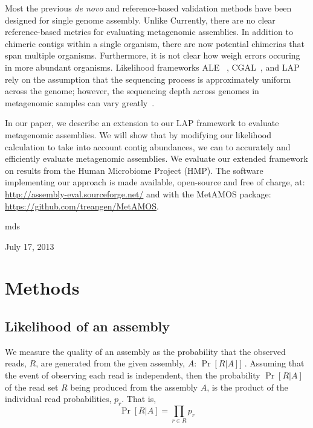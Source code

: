 \documentclass[conference]{IEEEtran}
\begin{document}
Most the previous \emph{de novo} and reference-based validation methods have been designed for single genome assembly.
Unlike 
Currently, there are no clear reference-based metrics for evaluating metagenomic assemblies.
In addition to chimeric contigs within a single organism, there are now potential chimerias that span multiple organisms.
Furthermore, it is not clear how weigh errors occuring in more abundant organisms.
Likelihood frameworks ALE ~\cite{clark2013ale}, CGAL~\cite{rahman2013cgal}, and LAP~\cite{LAP} rely on the assumption that the sequencing process is approximately uniform across the genome; however, the sequencing depth across genomes in metagenomic samples can vary greatly~\cite{carrigg2007dna,krsek1999comparison,morgan2010metagenomic,temperton2009bias,darling2004mauve}.


In our paper, we describe an extension to our LAP framework to evaluate metagenomic assemblies.
We will show that by modifying our likelihood calculation to take into account contig abundances, we can to accurately and efficiently evaluate metagenomic assemblies.
We evaluate our extended framework on results from the Human Microbiome Project (HMP).
The software implementing our approach is made available, open-source and free of charge, at: \url{http://assembly-eval.sourceforge.net/} and with the MetAMOS package: \url{https://github.com/treangen/MetAMOS}.

\hfill mds
 
\hfill July 17, 2013

\section{Methods}
\subsection{Likelihood of an assembly}

We measure the quality of an assembly as the probability that the observed reads, $R$, are generated from the given assembly, $A$: $\Pr[R|A]]$ \cite{LAP}.
Assuming that the event of observing each read is independent, then the probability $\Pr[R|A]$ of the read set $R$ being produced from the assembly $A$, is the product of the individual read probabilities, $p_r$.  That is,
\begin{equation}
  \label{probability_reads_given_assembly}
  \Pr[R \vert A]=\prod_{r \in R} p_r
\end{equation}
\end{document}
